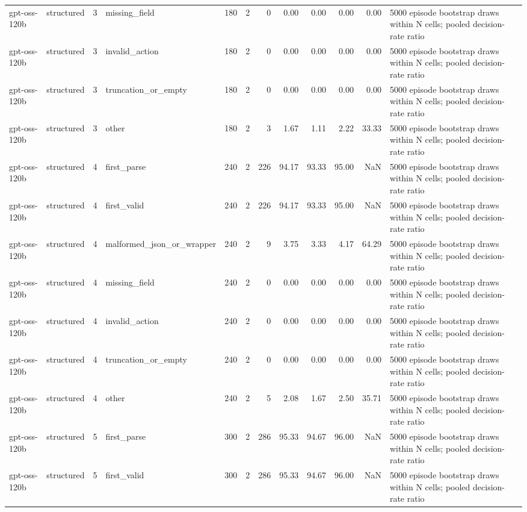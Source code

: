 \begin{tabular}{llllrrrrrrrl}
gpt-oss-120b & structured & 3 & missing\_field & 180 & 2 & 0 & 0.00 & 0.00 & 0.00 & 0.00 & 5000 episode bootstrap draws within N cells; pooled decision-rate ratio \\
gpt-oss-120b & structured & 3 & invalid\_action & 180 & 2 & 0 & 0.00 & 0.00 & 0.00 & 0.00 & 5000 episode bootstrap draws within N cells; pooled decision-rate ratio \\
gpt-oss-120b & structured & 3 & truncation\_or\_empty & 180 & 2 & 0 & 0.00 & 0.00 & 0.00 & 0.00 & 5000 episode bootstrap draws within N cells; pooled decision-rate ratio \\
gpt-oss-120b & structured & 3 & other & 180 & 2 & 3 & 1.67 & 1.11 & 2.22 & 33.33 & 5000 episode bootstrap draws within N cells; pooled decision-rate ratio \\
gpt-oss-120b & structured & 4 & first\_parse & 240 & 2 & 226 & 94.17 & 93.33 & 95.00 & NaN & 5000 episode bootstrap draws within N cells; pooled decision-rate ratio \\
gpt-oss-120b & structured & 4 & first\_valid & 240 & 2 & 226 & 94.17 & 93.33 & 95.00 & NaN & 5000 episode bootstrap draws within N cells; pooled decision-rate ratio \\
gpt-oss-120b & structured & 4 & malformed\_json\_or\_wrapper & 240 & 2 & 9 & 3.75 & 3.33 & 4.17 & 64.29 & 5000 episode bootstrap draws within N cells; pooled decision-rate ratio \\
gpt-oss-120b & structured & 4 & missing\_field & 240 & 2 & 0 & 0.00 & 0.00 & 0.00 & 0.00 & 5000 episode bootstrap draws within N cells; pooled decision-rate ratio \\
gpt-oss-120b & structured & 4 & invalid\_action & 240 & 2 & 0 & 0.00 & 0.00 & 0.00 & 0.00 & 5000 episode bootstrap draws within N cells; pooled decision-rate ratio \\
gpt-oss-120b & structured & 4 & truncation\_or\_empty & 240 & 2 & 0 & 0.00 & 0.00 & 0.00 & 0.00 & 5000 episode bootstrap draws within N cells; pooled decision-rate ratio \\
gpt-oss-120b & structured & 4 & other & 240 & 2 & 5 & 2.08 & 1.67 & 2.50 & 35.71 & 5000 episode bootstrap draws within N cells; pooled decision-rate ratio \\
gpt-oss-120b & structured & 5 & first\_parse & 300 & 2 & 286 & 95.33 & 94.67 & 96.00 & NaN & 5000 episode bootstrap draws within N cells; pooled decision-rate ratio \\
gpt-oss-120b & structured & 5 & first\_valid & 300 & 2 & 286 & 95.33 & 94.67 & 96.00 & NaN & 5000 episode bootstrap draws within N cells; pooled decision-rate ratio \\

\end{tabular}
